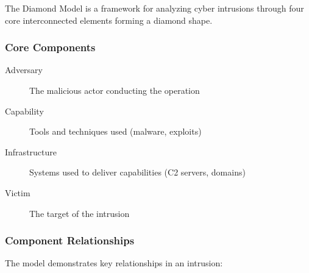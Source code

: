 The Diamond Model is a framework for analyzing cyber intrusions through four core interconnected elements forming a diamond shape.

\subsubsection{Core Components}
\begin{description}
    \item[Adversary] The malicious actor conducting the operation
    \item[Capability] Tools and techniques used (malware, exploits)
    \item[Infrastructure] Systems used to deliver capabilities (C2 servers, domains)
    \item[Victim] The target of the intrusion
\end{description}

\subsubsection{Component Relationships}
The model demonstrates key relationships in an intrusion:

